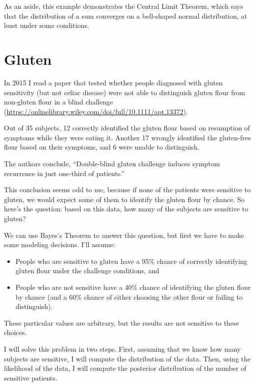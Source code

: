 \documentclass[12pt]{book}
\theoremstyle{exercise}
\begin{document}
As an aside, this example demonstrates the Central Limit Theorem, which says that the distribution of a sum converges on a bell-shaped normal distribution, at least under some conditions.

\section{Gluten}

In 2015 I read a paper that tested whether people diagnosed with gluten sensitivity (but not celiac disease) were not able to distinguish gluten flour from non-gluten flour in a blind challenge (\url{https://onlinelibrary.wiley.com/doi/full/10.1111/apt.13372}).

Out of 35 subjects, 12 correctly identified the gluten flour based on resumption of symptoms while they were eating it.  Another 17 wrongly identified the gluten-free flour based on their symptoms, and 6 were unable to distinguish.  

The authors conclude, ``Double-blind gluten challenge induces symptom recurrence in just one-third of patients.''

This conclusion seems odd to me, because if none of the patients were sensitive to gluten, we would expect some of them to identify the gluten flour by chance.
So here's the question: based on this data, how many of the subjects are sensitive to gluten?

We can use Bayes's Theorem to answer this question, but first we have to make some modeling decisions.
I'll assume:

\begin{itemize}

\item People who are sensitive to gluten have a 95\% chance of correctly identifying gluten flour under the challenge conditions, and 

\item People who are not sensitive have a 40\% chance of identifying the gluten flour by chance (and a 60\% chance of either choosing the other flour or failing to distinguish).

\end{itemize}

These particular values are arbitrary, but the results are not sensitive to these choices.

I will solve this problem in two steps.  First, assuming that we know how many subjects are sensitive, I will compute the distribution of the data.  Then, using the likelihood of the data, I will compute the posterior distribution of the number of sensitive patients.
\end{document}
